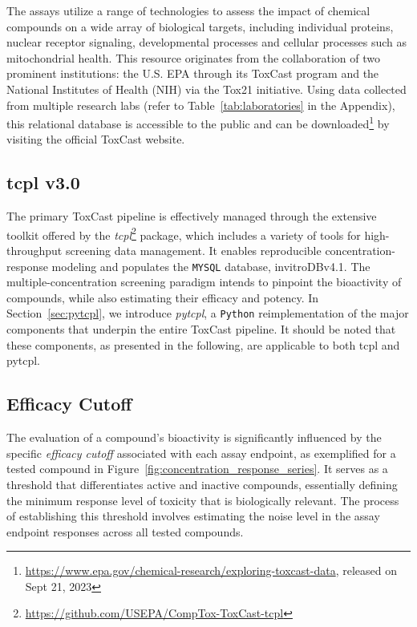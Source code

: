The assays utilize a range of technologies to assess the impact of chemical compounds on a wide array of biological targets, including individual proteins, nuclear receptor signaling, developmental processes and cellular processes such as mitochondrial health. This resource originates from the collaboration of two prominent institutions: the  U.S. EPA through its ToxCast program and the National Institutes of Health (NIH) via the Tox21 initiative. Using data collected from multiple research labs (refer to Table~\ref{tab:laboratories} in the Appendix), this relational database is accessible to the public and can be downloaded\footnote{\url{https://www.epa.gov/chemical-research/exploring-toxcast-data}, released on Sept 21, 2023} by visiting the official ToxCast website.

\subsection{tcpl v3.0}
The primary ToxCast pipeline is effectively managed through the extensive toolkit offered by the \emph{tcpl}\footnote{\url{https://github.com/USEPA/CompTox-ToxCast-tcpl}} package, which includes a variety of tools for high-throughput screening data management. It enables reproducible concentration-response modeling and populates the \texttt{MYSQL} database, invitroDBv4.1. The multiple-concentration screening paradigm intends to pinpoint the bioactivity of compounds, while also estimating their efficacy and potency. In Section~\ref{sec:pytcpl}, we introduce \emph{pytcpl}, a \texttt{Python} reimplementation of the major components that underpin the entire ToxCast pipeline. It should be noted that these components, as presented in the following, are applicable to both tcpl and pytcpl.

\subsection{Efficacy Cutoff}
The evaluation of a compound's bioactivity is significantly influenced by the specific \emph{efficacy cutoff} associated with each assay endpoint, as exemplified for a tested compound in Figure~\ref{fig:concentration_response_series}. It serves as a threshold that differentiates active and inactive compounds, essentially defining the minimum response level of toxicity that is biologically relevant. The process of establishing this threshold involves estimating the noise level in the assay endpoint responses across all tested compounds.


